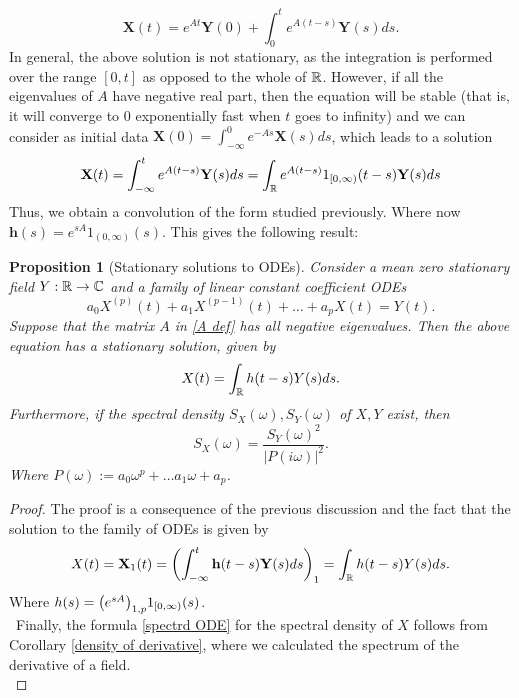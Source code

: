 \documentclass[12pt]{article}
\newtheorem{proposition}{Proposition}
\begin{document}
\begin{equation*}
    \mathbf{X}(t)=e^{A t}\mathbf{Y}(0)+\int_{0}^t e^{A(t-s)}\mathbf{Y}(s)ds.
\end{equation*}
In general, the above solution is not stationary, as the integration is performed over the range $[0,t]$ as opposed to the whole of  ${\mathbb R}$. However, if all the eigenvalues of $A$ have negative real part, then the equation will be stable (that is, it will converge to $0$ exponentially fast when  $t$ goes to infinity) and we can consider as initial data $\mathbf{X}(0)=\int_{-\infty}^0 e^{-As}\mathbf{X}(s)ds$, which leads to a solution
\begin{equation*}
    \mathbf{X}(t)=\int_{-\infty}^t e^{A(t-s)}\mathbf{Y}(s)ds=\int_{\mathbb R} e^{A(t-s)}1_{[0,\infty)}(t-s)\mathbf{Y}(s)ds
\end{equation*}
Thus, we obtain a convolution of the form studied previously. Where now $\mathbf{h}(s)=e^{sA}1_{(0,\infty)}(s)$. This gives the following result:
\begin{proposition}[Stationary solutions to ODEs]
    Consider a mean zero stationary field $Y:{\mathbb R}\to\mathbb{C}$ and a family of linear constant coefficient ODEs
    \begin{equation*}
        a_0X^{(p)}(t)+a_1X^{(p-1)}(t)+\ldots+a_pX(t)=Y(t).
    \end{equation*}
    Suppose that the matrix $A$ in \eqref{A def}  has all negative eigenvalues. Then the above equation has a stationary solution, given by
    \begin{equation*}
        X(t)=\int_{\mathbb R} h(t-s){Y}(s)ds.
    \end{equation*}
    Furthermore, if the spectral density $S_X(\omega),S_Y(\omega)$ of $X,Y$ exist, then
    \begin{equation}\label{spectrd ODE}
        S_X(\omega)=\frac{S_Y(\omega)^2}{|P(i\omega)|^2}.
    \end{equation}
    Where $P(\omega):=a_0\omega^p+\ldots a_{1}\omega+a_p$.
\end{proposition}
\begin{proof}
    The proof is a consequence of the previous discussion and the fact that the solution to the family of ODEs is given by
    \begin{equation*}
        X(t)=\mathbf{X}_1(t)=\qty(\int_{-\infty}^t \mathbf{h}(t-s)\mathbf{Y}(s)ds)_1=\int_{\mathbb R} h(t-s)Y(s)ds.
    \end{equation*}
    Where $h(s)=\qty(e^{sA})_{1,p}1_{[0,\infty)}(s)$.\\
    \
    Finally, the formula \eqref{spectrd ODE} for the spectral density of $X$ follows from Corollary \ref{density of derivative}, where we calculated the spectrum of the derivative of a field.\\
\end{proof}
\end{document}
